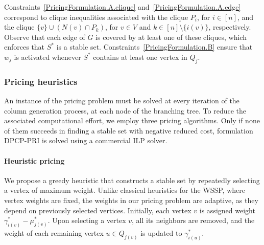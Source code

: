 \documentclass[preprint, 11pt, authoryear]{elsarticle}
\newcommand{\pricingform}{\text{DPCP-PRI}}
\begin{document}
Constraints~\eqref{PricingFormulation.A.clique} and~\eqref{PricingFormulation.A.edge} correspond to clique inequalities associated with the clique $P_i$, for $i \in [n]$, and the clique $\{v\} \cup (N(v) \cap P_k)$, for $v \in V$ and $k \in [n] \setminus \{i(v)\}$, respectively. 
Observe that each edge of $G$ is covered by at least one of these cliques, which enforces that $S^*$ is a stable set.
Constraints~\eqref{PricingFormulation.B} ensure that $w_j$ is activated whenever $S^*$ contains at least one vertex in $Q_j$. 




 

\subsubsection{Pricing heuristics}

An instance of the pricing problem must be solved at every iteration of the column generation process, at each node of the branching tree. To reduce the associated computational effort, we employ three pricing algorithms. Only if none of them succeeds in finding a stable set with negative reduced cost, formulation DPCP-PRI is solved using a commercial ILP solver.

\paragraph{Heuristic pricing}

We propose a greedy heuristic that constructs a stable set by repeatedly selecting a vertex of maximum weight.
Unlike classical heuristics for the WSSP, where vertex weights are fixed, the weights in our pricing problem are adaptive, as they depend on previously selected vertices. 
Initially, each vertex $v$ is assigned weight $\gamma^*_{i(v)} - \mu^*_{j(v)}$. Upon selecting a vertex $v$, all its neighbors are removed, and the weight of each remaining vertex $u \in Q_{j(v)}$ is updated to $\gamma^*_{i(u)}$. %
\end{document}
